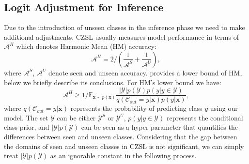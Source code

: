 \documentclass[letterpaper]{article} %
\newcommand{\mx}{\mathbf{x}}
\theoremstyle{definition}
\begin{document}
 \subsection{Logit Adjustment for Inference} \label{subsec.inference}
Due to the introduction of unseen classes in the inference phase we need to make additional adjustments. CZSL usually measures model performance in terms of $\mathcal{A}^{H}$ which denotes Harmonic Mean (HM) accuracy:
	\begin{equation}
	\mathcal{A}^H=2/(\frac{1}{\mathcal{A}^S}+\frac{1}{\mathcal{A}^U}),
    \label{eq_ah}
	\end{equation}
 where $\mathcal{A}^{S}$, $\mathcal{A}^U$ denote seen and unseen accuracy.  \citet{chen2022zero} provides a lower bound of HM, below we briefly describe its conclusions. For HM's lower bound we have:
	\begin{equation}
	\mathcal{A}^{H}\ge 1/\mathbb{E}_{\mathbf{x}\sim p(\mathbf{x})}\frac{|\mathcal{Y}|p(\mathcal{Y})p(y|y\in \mathcal{Y})}{q(\mathcal{C}_{out}=y|\mathbf{x})p(y|\mathbf{x})},
    \label{eq_lowerbound}
	\end{equation}
where $q(\mathcal{C}_{out}=y|\mx)$ represents the probability of predicting class $y$ using our model. The set $\mathcal{Y}$ can be either $\mathcal{Y}^{S}$ or $\mathcal{Y}^{U}$, $p(y|y\in \mathcal{Y})$ represents the conditional class prior, and $|\mathcal{Y}|p(\mathcal{Y})$ can be seen as a hyper-parameter that quantifies the differences between seen and unseen classes. Considering that the gap between the domains of seen and unseen classes in CZSL is not significant, we can simply treat $|\mathcal{Y}|p(\mathcal{Y})$ as an ignorable constant in the following process.
\end{document}
